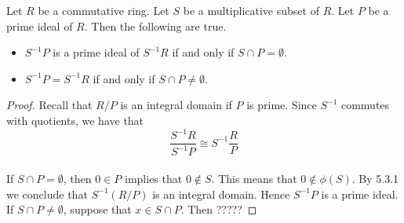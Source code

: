 \documentclass[a4paper]{article}
\begin{document}
\begin{prp}{}{} Let $R$ be a commutative ring. Let $S$ be a multiplicative subset of $R$. Let $P$ be a prime ideal of $R$. Then the following are true. 
\begin{itemize}
\item $S^{-1}P$ is a prime ideal of $S^{-1}R$ if and only if $S\cap P=\emptyset$. 
\item $S^{-1}P=S^{-1}R$ if and only if $S\cap P\neq\emptyset$. 
\end{itemize} \tcbline
\begin{proof}
Recall that $R/P$ is an integral domain if $P$ is prime. Since $S^{-1}$ commutes with quotients, we have that $$\frac{S^{-1}R}{S^{-1}P}\cong S^{-1}\frac{R}{P}$$~\\

If $S\cap P=\emptyset$, then $0\in P$ implies that $0\notin S$. This means that $0\notin\phi(S)$. By 5.3.1 we conclude that $S^{-1}(R/P)$ is an integral domain. Hence $S^{-1}P$ is a prime ideal. If $S\cap P\neq\emptyset$, suppose that $x\in S\cap P$. Then ?????
\end{proof}
\end{prp}
\end{document}
